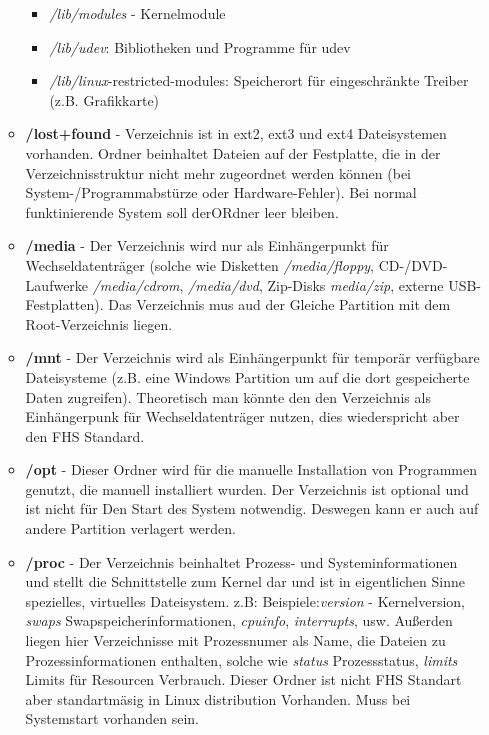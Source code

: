 \begin{itemize}
\begin{itemize}
			\begin{itemize}
				\item \textit{/lib/modules} - Kernelmodule
				\item \textit{/lib/udev}: Bibliotheken und Programme für udev
				\item \textit{/lib/linux}-restricted-modules: Speicherort für eingeschränkte Treiber (z.B. Grafikkarte)
			\end{itemize}
			\item \textbf{/lost+found} - Verzeichnis ist in ext2, ext3 und ext4 Dateisystemen vorhanden.
			Ordner beinhaltet Dateien auf der Festplatte,
			die in der Verzeichnisstruktur nicht mehr zugeordnet werden können (bei System-/Programmabstürze oder Hardware-Fehler).
			Bei normal funktinierende System soll derORdner leer bleiben.
			\item \textbf{/media} - Der Verzeichnis wird nur als Einhängerpunkt für Wechseldatenträger
			(solche wie Disketten \textit{/media/floppy}, CD-/DVD-Laufwerke \textit{/media/cdrom},
			\textit{/media/dvd}, Zip-Disks \textit{media/zip}, externe USB-Festplatten).
			Das Verzeichnis mus aud der Gleiche Partition mit dem Root-Verzeichnis liegen.
			\item \textbf{/mnt} - Der Verzeichnis wird als Einhängerpunkt für temporär verfügbare Dateisysteme
			(z.B. eine Windows Partition um auf die dort gespeicherte Daten zugreifen). Theoretisch man könnte
			den den Verzeichnis als Einhängerpunk für Wechseldatenträger nutzen, dies wiederspricht aber den
			FHS Standard.
			\item \textbf{/opt} - Dieser Ordner wird für die manuelle Installation von Programmen genutzt,
			die manuell installiert wurden. Der Verzeichnis ist optional und ist nicht für Den Start des System notwendig.
			Deswegen kann er auch auf andere Partition verlagert werden.
			\item \textbf{/proc} - Der Verzeichnis beinhaltet Prozess- und Systeminformationen und stellt die Schnittstelle zum Kernel dar
			und ist in eigentlichen Sinne spezielles, virtuelles Dateisystem.
			z.B: Beispiele:\textit{version} - Kernelversion, \textit{swaps} Swapspeicherinformationen, \textit{cpuinfo}, \textit{interrupts}, usw.
			Außerden liegen hier Verzeichnisse mit Prozessnumer als Name, die Dateien zu Prozessinformationen enthalten, solche wie
			\textit{status} Prozessstatus, \textit{limits} Limits für Resourcen Verbrauch.
			Dieser Ordner ist nicht FHS Standart aber standartmäsig in Linux distribution Vorhanden. Muss bei Systemstart vorhanden sein.

\end{itemize}
\end{itemize}
